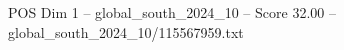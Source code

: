 \begin{textsample}{POS Dim 1 – global\_south\_2024\_10 – Score 32.00 – global\_south\_2024\_10/115567959.txt}
\end{textsample}
